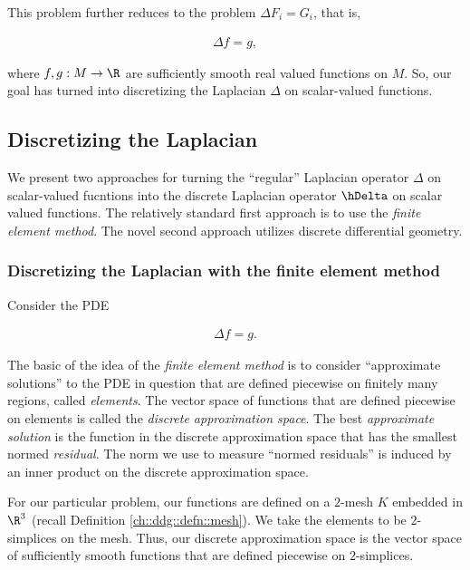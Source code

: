 This problem further reduces to the problem $\Delta F_i = G_i$, that is,

\begin{align*}
    \Delta f = g,
\end{align*}

where $f, g:M \rightarrow \R$ are sufficiently smooth real valued functions on $M$. So, our goal has turned into discretizing the Laplacian $\Delta$ on scalar-valued functions.

\subsection*{Discretizing the Laplacian}

We present two approaches for turning the ``regular'' Laplacian operator $\Delta$ on scalar-valued fucntions into the discrete Laplacian operator $\hDelta$ on scalar valued functions. The relatively standard first approach is to use the \textit{finite element method}. The novel second approach utilizes discrete differential geometry.


\subsubsection*{Discretizing the Laplacian with the finite element method}

Consider the PDE

\begin{align*}
    \Delta f = g.
\end{align*}

The basic of the idea of the \textit{finite element method} is to consider ``approximate solutions'' to the PDE in question that are defined piecewise on finitely many regions, called \textit{elements}. The vector space of functions that are defined piecewise on elements is called the \textit{discrete approximation space}. The best \textit{approximate solution} is the function in the discrete approximation space that has the smallest normed \textit{residual}. The norm we use to measure ``normed residuals'' is induced by an inner product on the discrete approximation space.

For our particular problem, our functions are defined on a $2$-mesh $K$ embedded in $\R^3$ (recall Definition \ref{ch::ddg::defn::mesh}). We take the elements to be $2$-simplices on the mesh. Thus, our discrete approximation space is the vector space of sufficiently smooth functions that are defined piecewise on $2$-simplices. 

